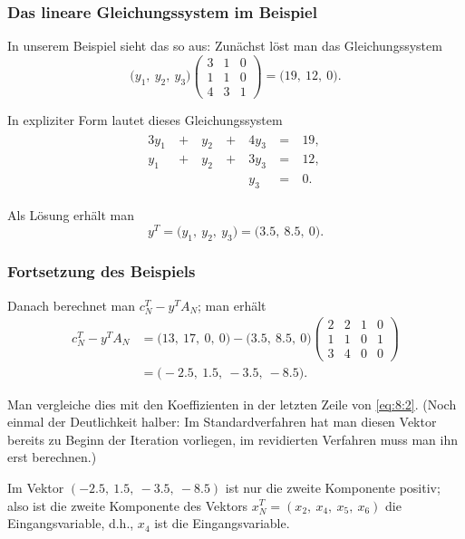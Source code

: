 \documentclass[smaller]{beamer}
\begin{document}
\begin{frame}
 \frametitle{Das lineare Gleichungssystem im Beispiel}
 In unserem Beispiel sieht das so aus: Zunächst löst man das Gleichungssystem
\[
\big( y_1,\ y_2,\ y_3\big) \begin{pmatrix} 3 & 1 & 0 \\ 1 & 1 & 0 \\ 4 & 3 & 1 \end{pmatrix} = \big( 19,\ 12,\ 0 \big).
\]

In expliziter Form lautet dieses Gleichungssystem
\begin{align*}
\begin{alignedat}{4}
3y_1 &\ + &\ y_2 &\ + &\ 4y_3 &\ = &\ 19,\ \\
 y_1 &\ + &\ y_2 &\ + &\ 3y_3 &\ = &\ 12,\ \\
     &\   &\     &\   &\  y_3 &\ = &\  0.\ 
\end{alignedat}
\end{align*}

Als Lösung erhält man
\[
y^T = \big( y_1,\ y_2,\ y_3 \big) = \big( 3.5,\ 8.5,\ 0 \big).
\]
\end{frame}

\begin{frame}
 \frametitle{Fortsetzung des Beispiels}
 Danach berechnet man $c_N^T-y^TA_N$; man erhält
\begin{align*}
c_N^T - y^TA_N &= \big( 13,\ 17,\ 0,\ 0 \big) - \big( 3.5,\ 8.5,\ 0 \big) \begin{pmatrix} 2 & 2 & 1 & 0 \\ 1 & 1 & 0 & 1 \\ 3 & 4 & 0 & 0 \end{pmatrix} \\
&= \big( -2.5,\ 1.5,\ -3.5,\ -8.5 \big).
\end{align*}

Man vergleiche dies mit den Koeffizienten in der letzten Zeile von \eqref{eq:8:2}. (Noch einmal der Deutlichkeit halber: \alert{Im Standardverfahren hat man diesen Vektor bereits zu Beginn der Iteration vorliegen, im revidierten Verfahren muss man ihn erst berechnen}.) \\ \vspace*{0.2cm}

Im Vektor $(-2.5,\ 1.5,\ -3.5,\ -8.5)$ ist nur die zweite Komponente positiv; also ist die zweite Komponente des Vektors $x_N^T = (x_2,\ x_4,\ x_5,\ x_6)$ die Eingangsvariable, d.h., \alert{$x_4$ ist die Eingangsvariable}.
\end{frame}
\end{document}
